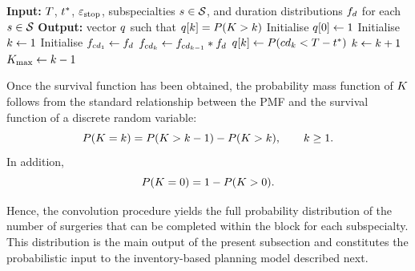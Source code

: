 \begin{algorithm}[H]
\scriptsize{
\caption{Computation of $P(\numcompletedsurgs > \completedsurgsidx)$ via convolutions\label{alg:newsvendor}}
\begin{algorithmic}[1]
\State \textbf{Input:} $T$, $t^{*}$, $\varepsilon_{\text{stop}}$, subspecialties $s \in \mathcal{S}$, and duration distributions $f_{d}$ for each $s \in \mathcal{S}$
\State \textbf{Output:} vector $q$ such that $q[k]=P(K > k)$
    \State Initialise $q[0] \gets 1$
    \State Initialise $k \gets 1$
    \State Initialise $f_{cd_{1}} \gets f_{d}$
    \While{$\survivalvector[\completedsurgsidx-1] > \probstoppingthreshold$}
            \State $f_{cd_{k}} \gets f_{cd_{k-1}} \ast f_{d}$
        \EndIf
        \State $q[k] \gets P(cd_{k} < T - t^{*})$
        \State $k \gets k + 1$
    \EndWhile
    \State $K_{\max} \gets k - 1$
\EndFor
\end{algorithmic}
}
\end{algorithm}

Once the survival function has been obtained, the probability mass function of $K$ follows from the standard relationship between the PMF and the survival function of a discrete random variable:
\begin{equation}\label{eq:pmf_numcompletedsurgs_revised}
P(K = k)
=
P(K > k-1)-P(K > k),
\qquad k \geq 1.
\end{equation}
In addition,
\[
P(K = 0)=1-P(K > 0).
\]

Hence, the convolution procedure yields the full probability distribution of the number of surgeries that can be completed within the block for each subspecialty. 
This distribution is the main output of the present subsection and constitutes the probabilistic input to the inventory-based planning model described next.

